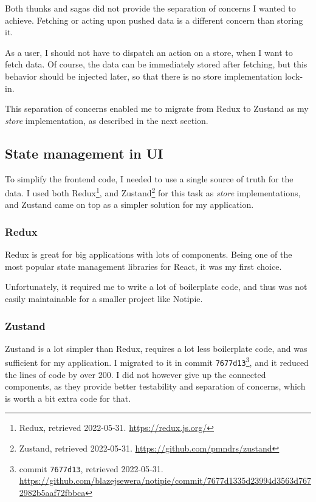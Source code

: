 Both thunks and sagas did not provide the separation of concerns I
wanted to achieve. Fetching or acting upon pushed data is a different
concern than storing it.

As a user, I should not have to dispatch an action on a store, when I
want to fetch data. Of course, the data can be immediately stored after
fetching, but this behavior should be injected later, so that there is
no store implementation lock-in.

This separation of concerns enabled me to migrate from Redux to Zustand
as my \emph{store} implementation, as described in the next section.

\hypertarget{state-management-in-ui}{%
	\subsection{State management in UI}\label{state-management-in-ui}}

To simplify the frontend code, I needed to use a single source of truth
for the data. I used both Redux\footnote{Redux, retrieved 2022-05-31.
	\url{https://redux.js.org/}}, and Zustand\footnote{Zustand, retrieved
	2022-05-31. \url{https://github.com/pmndrs/zustand}} for this task as
\emph{store} implementations, and Zustand came on top as a simpler
solution for my application.

\hypertarget{redux}{%
	\subsubsection{Redux}\label{redux}}

Redux is great for big applications with lots of components. Being one
of the most popular state management libraries for React, it was my
first choice.

Unfortunately, it required me to write a lot of boilerplate code, and
thus was not easily maintainable for a smaller project like Notipie.

\hypertarget{zustand}{%
	\subsubsection{Zustand}\label{zustand}}

Zustand is a lot simpler than Redux, requires a lot less boilerplate
code, and was sufficient for my application. I migrated to it in commit
\texttt{7677d13}\footnote{commit \texttt{7677d13}, retrieved 2022-05-31.
	\url{https://github.com/blazejsewera/notipie/commit/7677d1335d23994d3563d7672982b5aaf72fbbca}},
and it reduced the lines of code by over 200. I did not however give up
the connected components, as they provide better testability and
separation of concerns, which is worth a bit extra code for that.

